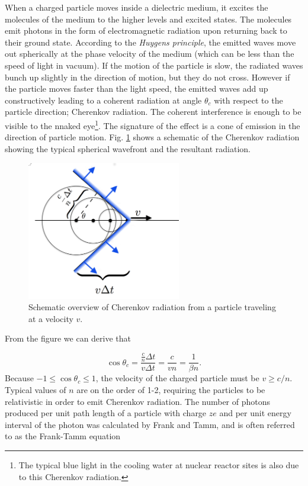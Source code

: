 When a charged particle moves inside a dielectric medium, it excites the molecules of the medium to the higher levels and excited states. The molecules emit photons in the form of electromagnetic radiation upon returning back to their ground state. According to the \textit{Huygens principle}, the emitted waves move out spherically at the phase velocity of the medium (which can be less than the speed of light in vacuum). If the motion of the particle is slow, the radiated waves bunch up slightly in the direction of motion, but they do not cross. However if the particle moves faster than the light speed, the emitted waves add up constructively leading to a coherent radiation at angle $\theta_c$ with respect to the particle direction; Cherenkov radiation. The coherent interference is enough to be visible to the nnaked eye\footnote{The typical blue light in the cooling water at nuclear reactor sites is also due to this Cherenkov radiation.}. The signature of the effect is a cone of emission in the direction of particle motion. Fig. \ref{fig:cherenkov} shows a schematic of the Cherenkov radiation showing the typical spherical wavefront and the resultant radiation.

\begin{figure}[ht]
\label{fig:cherenkov}
\centering
\includegraphics[width=0.6\textwidth]{chapter4/img/cherenkov2.png}
\caption{Schematic overview of Cherenkov radiation from a particle traveling at a velocity $v$.}
\end{figure}

From the figure we can derive that

\begin{equation}
\cos\theta_c = \frac{\frac{c}{n} \Delta t}{v \Delta t} = \frac{c}{vn} = \frac{1}{\beta n}.
\end{equation} 
Because $-1 \leq \cos\theta_c \leq 1$, the velocity of the charged particle must be $v \geq c/n$. Typical values of $n$ are on the order of 1-2, requiring the particles to be relativistic in order to emit Cherenkov radiation. The number of photons produced per unit path length of a particle with charge $ze$ and per unit energy interval of the photon was calculated by Frank and Tamm, and is often referred to as the Frank-Tamm equation

